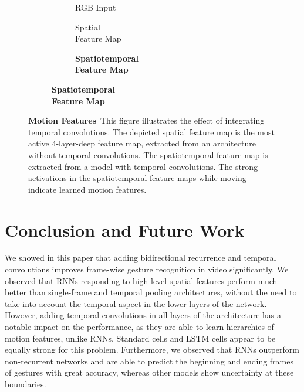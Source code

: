 \documentclass[11pt,a4paper]{article} \usepackage{a4wide}
\begin{document}
\begin{figure}[tb]
\begin{subfigure}{0.48\textwidth}
\begin{subfigure}[t]{\figspace}
{\begin{tikzpicture}[inner sep=0pt, outer sep=0pt]
\end{tikzpicture} }
	\caption{RGB Input}
	\label{fig:mrgb}
	\end{subfigure}
\begin{subfigure}[t]{\figspace}
	\centering
	\caption{Spatial\\Feature Map}
	\label{fig:ms}
	\end{subfigure}
\begin{subfigure}[t]{\figspace}
	\centering
	\caption{\textbf{Spatiotemporal\\Feature Map}}
	\label{fig:mt}
	\end{subfigure}
\end{subfigure}
\caption{\textbf{Motion Features}\, This figure illustrates the effect of integrating temporal convolutions. The depicted spatial feature map is the most active 4-layer-deep feature map, extracted from an architecture without temporal convolutions. The spatiotemporal feature map is extracted from a model with temporal convolutions. The strong activations in the spatiotemporal feature maps while moving indicate learned motion features.}
\label{fig:motion}
\end{figure}





\section{Conclusion and Future Work} \label{sec:conclusion}
We showed in this paper that adding bidirectional recurrence and temporal convolutions improves frame-wise gesture recognition in video significantly. We observed that RNNs responding to high-level spatial features perform much better than single-frame and temporal pooling architectures, without the need to take into account the temporal aspect in the lower layers of the network. However, adding temporal convolutions in all layers of the architecture has a notable impact on the performance, as they are able to learn hierarchies of motion features, unlike RNNs. Standard cells and LSTM cells appear to be equally strong for this problem. 
Furthermore, we observed that RNNs outperform non-recurrent networks and are able to predict the beginning and ending frames of gestures with great accuracy, whereas other models show uncertainty at these boundaries.
\end{document}
